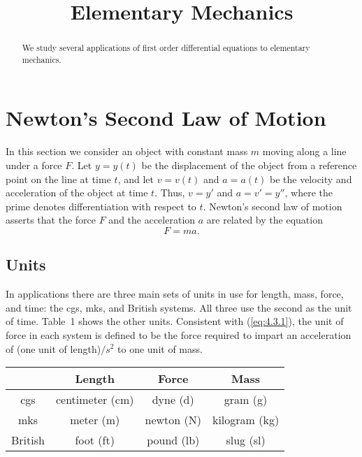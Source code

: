 \documentclass{ximera}
\title{Elementary Mechanics}
\begin{document}
 
\begin{abstract}
We study several applications of first order differential equations to elementary mechanics. 
\end{abstract}
 
\maketitle
 
 
 
\section*{Newton's Second Law of Motion}
 
 
In this section we consider an object with constant mass $m$ moving
along a line under a force $F$. Let $y=y(t)$ be the displacement of
the object from a reference point on the line at time $t$, and let
$v=v(t)$ and $a=a(t)$ be the velocity and acceleration of the object
at time $t$. Thus, $v=y'$ and $a=v'=y''$, where the prime denotes
differentiation with respect to $t$. Newton's second law of motion
asserts that the force $F$ and the acceleration $a$ are related by the
equation
\begin{equation} \label{eq:4.3.1}
F=ma.
\end{equation}
 
\subsection*{Units}
 
In applications there are three main sets of units in use for length,
mass, force, and time: the cgs, mks, and British systems. All three
use the second as the unit of time. Table~1 shows the other units.
 Consistent with (\ref{eq:4.3.1}), the unit of
force in each system is defined to be the force required to impart an
acceleration of (one unit of length)$/s^2$ to one unit of
mass.
 
\bigskip
\begin{center}
\begin{tabular}{|c|c|c|c|}
\hline
& {\bf Length}&{\bf Force}& {\bf Mass}\\\hline
  cgs & centimeter (cm) & dyne (d) & gram (g)\\\hline
 mks & meter (m) & newton (N) & kilogram (kg) \\\hline
British & foot (ft) & pound (lb) & slug (sl)\\\hline
\end{tabular}
 \end{center}
 
\end{document}
